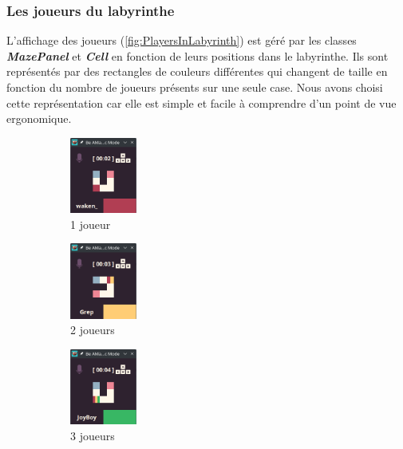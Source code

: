 \subsubsection*{Les joueurs du labyrinthe}

L'affichage des joueurs (\ref{fig:PlayersInLabyrinth}) est géré par les classes \textbf{\textit{MazePanel}} et \textbf{\textit{Cell}} en fonction de leurs positions dans le labyrinthe. Ils sont représentés par des rectangles de couleurs différentes qui changent de taille en fonction du nombre de joueurs présents sur une seule case. Nous avons choisi cette représentation car elle est simple et facile à comprendre d'un point de vue ergonomique.

\begin{figure}[!htb]
    \centering
    \begin{subfigure}{2.2cm}
        \includegraphics[width=2.2cm]{ressources/Implementation/Labyrinthe/Vue/Players/1Player.png}%
        \caption{1 joueur}
        \label{fig:1Player}
    \end{subfigure}
    \qquad
    \begin{subfigure}{2.2cm}
        \includegraphics[width=2.2cm]{ressources/Implementation/Labyrinthe/Vue/Players/2Players.png}%
        \caption{2 joueurs}
        \label{fig:2Players}
    \end{subfigure}
    \qquad
    \begin{subfigure}{2.2cm}
        \includegraphics[width=2.2cm]{ressources/Implementation/Labyrinthe/Vue/Players/3Players.png}%
        \caption{3 joueurs}
        \label{fig:3Players}
    \end{subfigure}
    \qquad
    \begin{subfigure}{2.2cm}

\end{subfigure}
\end{figure}
